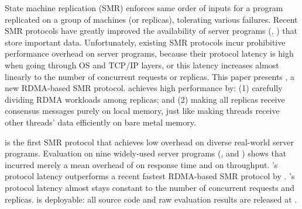 State machine replication (SMR) enforces same order of inputs 
for a program replicated on a group of machines (or replicas), 
tolerating various failures. Recent SMR protocols have greatly improved
the availability of server programs (\eg, \redis) that store important data. 
Unfortunately, existing SMR protocols incur prohibitive performance overhead on 
server programs, because their protocol latency is high when going through OS 
and TCP/IP layers, or this latency increases almost linearly to the number of 
concurrent requests or replicas. This paper presents \xxx, a new 
RDMA-based SMR protocol. \xxx achieves high performance by: (1) carefully 
dividing RDMA workloads among replicas; and (2) making all replicas receive 
consensus messages purely on local memory, just like making threads receive 
other threads' data efficiently on bare metal memory.


\xxx is the first SMR protocol that achieves low overhead on diverse 
real-world server programs. Evaluation on nine widely-used server programs (\eg, 
\redis and \mysql) shows that \xxx incurred merely a mean overhead of 
\latencyoverhead on response time and \tputoverhead on throughput.
\xxx's protocol latency outperforms a recent fastest RDMA-based SMR protocol 
by \fasterDARE. \xxx's protocol latency almost stays constant to the number of 
concurrent requests and replicas. \xxx is deployable: all source code and raw 
evaluation results are released at \github.



